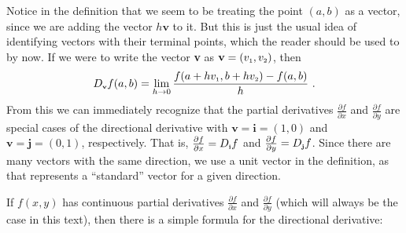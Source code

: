 Notice in the definition that we seem to be treating the point $(a,b)$ as a vector, since we are adding the
vector $h\textbf{v}$ to it. But this is just the usual idea of identifying vectors with their terminal points, which
the reader should be used to by now. If we were to write the vector \textbf{v} as $\textbf{v} = (v_{\scriptscriptstyle 1},v_{\scriptscriptstyle 2})$, then
\begin{equation}\label{eqn:dirderivpt}
 D_{\scriptscriptstyle \textbf{v}}f(a,b) = \lim_{h \to 0} \dfrac{f(a+hv_{\scriptscriptstyle 1},b+hv_{\scriptscriptstyle 2}) - f(a,b)}{h} ~.
\end{equation}
From this we can immediately recognize that the partial derivatives $\tfrac{\partial f}{\partial x}$ and
$\tfrac{\partial f}{\partial y}$ are special cases of the directional derivative with $\textbf{v} = \textbf{i} = (1,0)$
and $\textbf{v} = \textbf{j} = (0,1)$, respectively. That is, $\tfrac{\partial f}{\partial x} = D_{\scriptscriptstyle \textbf{i}}f$
and $\tfrac{\partial f}{\partial y} = D_{\scriptscriptstyle \textbf{j}}f$. Since there are many vectors with the same
direction, we use a unit vector in the definition, as that represents a ``standard'' vector for a given
direction.

If $f(x,y)$ has continuous partial derivatives $\tfrac{\partial f}{\partial x}$ and
$\tfrac{\partial f}{\partial y}$ (which will always be the case in this text), then there is a simple formula for the
directional derivative:

